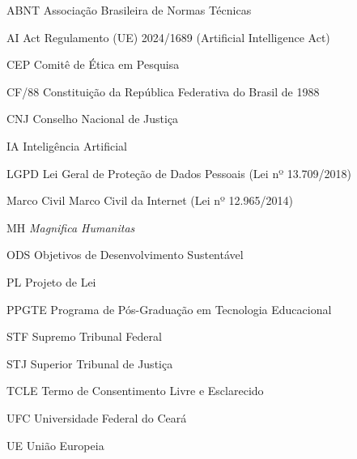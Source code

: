 \documentclass[
    12pt,
    openany,
    oneside,
    a4paper,
    brazilian
]{abntex2}
\begin{document}
\begin{siglas}
    \item[ABNT] Associação Brasileira de Normas Técnicas
    \item[AI Act] Regulamento (UE) 2024/1689 (Artificial Intelligence Act)
    \item[CEP] Comitê de Ética em Pesquisa
    \item[CF/88] Constituição da República Federativa do Brasil de 1988
    \item[CNJ] Conselho Nacional de Justiça
    \item[IA] Inteligência Artificial
    \item[LGPD] Lei Geral de Proteção de Dados Pessoais (Lei nº 13.709/2018)
    \item[Marco Civil] Marco Civil da Internet (Lei nº 12.965/2014)
    \item[MH] \textit{Magnifica Humanitas}
    \item[ODS] Objetivos de Desenvolvimento Sustentável
    \item[PL] Projeto de Lei
    \item[PPGTE] Programa de Pós-Graduação em Tecnologia Educacional
    \item[STF] Supremo Tribunal Federal
    \item[STJ] Superior Tribunal de Justiça
    \item[TCLE] Termo de Consentimento Livre e Esclarecido
    \item[UFC] Universidade Federal do Ceará
    \item[UE] União Europeia
\end{siglas}

\tableofcontents
\clearpage










\begin{anexosenv}
    \partanexos
    
\end{anexosenv}
\end{document}
